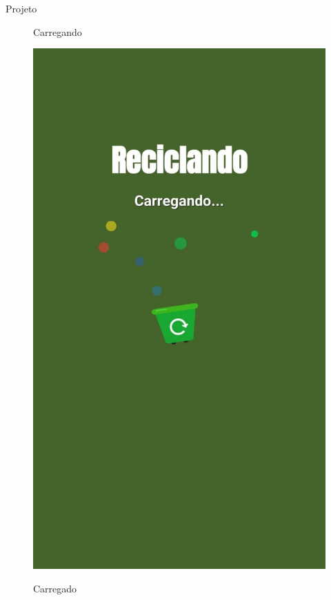 \documentclass[
	12pt,				%
	openany,			%
	twoside,			%
	a4paper,			%
	english,			%
	french,				%
	spanish,			%
	brazil				%
	]{abntex2}
\begin{document}
\begin{chapter}{Projeto}
    \begin{figure}[htb]    
 \centering
  \begin{minipage}{0.5\textwidth}
    \centering
    \caption{Carregando}
    \includegraphics[scale=0.35]{media/tela_splash_1.jpg}
     \label{fig:tela_splash_1_app}
  \end{minipage}
  \hfill
  \begin{minipage}{0.45\textwidth}
    \centering
    \caption{Carregado}

\end{minipage}
\end{figure}
\end{chapter}
\end{document}
